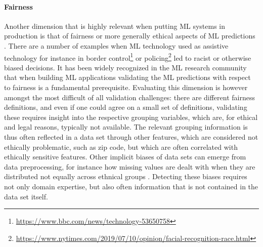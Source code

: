 \paragraph{Fairness}
Another dimension that is highly relevant when putting ML systems in production is that of fairness or more generally ethical aspects of ML predictions \cite{Mehrabi2019}. There are a number of examples when ML technology used as assistive technology for instance in border control\footnote{\url{https://www.bbc.com/news/technology-53650758}} or policing\footnote{\url{https://www.nytimes.com/2019/07/10/opinion/facial-recognition-race.html}} led to racist or otherwise biased decisions. It has been widely recognized in the ML research community that when building ML applications validating the ML predictions with respect to fairness is a fundamental prerequisite. Evaluating this dimension is however amongst the most difficult of all validation  challenges: there are different fairness definitions, and even if one could agree on a small set of definitions, validating these requires insight into the respective grouping variables, which are, for ethical and legal reasons, typically not available. The relevant grouping information is thus often reflected in a data set through other features, which are considered not ethically problematic, such as zip code, but which are often correlated with ethically sensitive features. Other implicit biases of data sets can emerge from data preprocessing, for instance how missing values are dealt with when they are distributed not equally across ethnical groups \cite{Yang2020}. Detecting these biases requires not only domain expertise, but also often information that is not contained in the data set itself.



%
%

